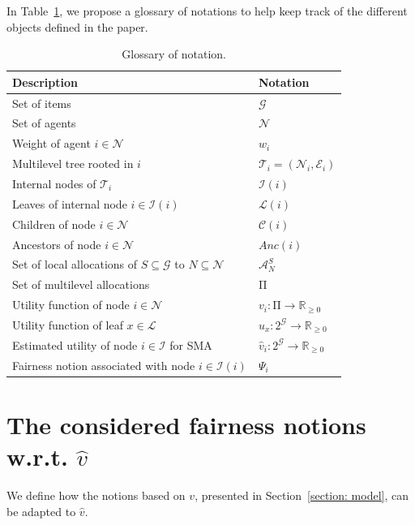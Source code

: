 \documentclass[]{article}
\newcommand{\tree}{\mathcal{T}}
\newcommand{\nodes}{\mathcal{N}}
\newcommand{\edges}{\mathcal{E}}
\newcommand{\items}{\mathcal{G}}
\newcommand{\children}{\mathcal{C}}
\newcommand{\leaves}{\mathcal{L}}
\newcommand{\internal}{\mathcal{I}}
\newcommand{\ancestors}{Anc}
\newcommand{\mallocations}{\mathrm{\Pi}}
\newcommand{\allocations}{\mathcal{A}}
\begin{document}
In Table~\ref{tab:glossary}, we propose a glossary of notations to help keep track of the different objects defined in the paper. 

\begin{table}[h]
    \centering
    \begin{tabular}{ll}
    \toprule
    \textbf{Description} & \textbf{Notation} \\
    \midrule
    Set of items & $\items$ \\
    Set of agents & $\nodes$ \\
    Weight of agent $i \in \nodes$ & $w_i$ \\
    Multilevel tree rooted in $i$ & $\tree_i = (\nodes_i, \edges_i)$ \\
    Internal nodes of $\tree_i$ & $\internal(i)$ \\
    Leaves of internal node $i \in \internal(i)$ & $\leaves(i)$ \\
    Children of node $i \in \nodes$ & $\children(i)$ \\
    Ancestors of node $i \in \nodes$ & $\ancestors(i)$ \\
    Set of local allocations of $S \subseteq \items$ to $N \subseteq \nodes$ & $\allocations^S_N$ \\
    Set of multilevel allocations & $\mallocations$ \\
    Utility function of node $i \in \nodes$ & $v_i : \mallocations \rightarrow \mathbb{R}_{\geq 0}$ \\
    Utility function of leaf $x \in \leaves$ & $u_x : 2^\items \rightarrow \mathbb{R}_{\geq 0}$ \\
    Estimated utility of node $i \in \internal$ for SMA & $\hat{v}_i : 2^\items \rightarrow \mathbb{R}_{\geq 0}$ \\
    Fairness notion associated with node $i \in \internal(i)$ & $\Psi_i$ \\
    \bottomrule
    \end{tabular}
    \caption{Glossary of notation.}
    \label{tab:glossary}
\end{table}

\section{The considered fairness notions w.r.t. $\hat{v}$} \label{appendix: fairness v-hat}

We define how the notions based on $v$, presented in Section~\ref{section: model}, can be adapted to $\hat{v}$. 
\end{document}
